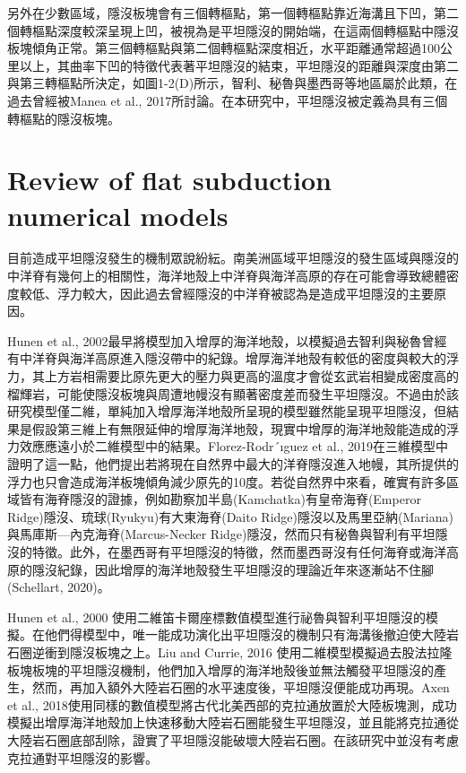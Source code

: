 另外在少數區域，隱沒板塊會有三個轉樞點，第一個轉樞點靠近海溝且下凹，第二個轉樞點深度較深呈現上凹，被視為是平坦隱沒的開始端，在這兩個轉樞點中隱沒板塊傾角正常。第三個轉樞點與第二個轉樞點深度相近，水平距離通常超過100公里以上，其曲率下凹的特徵代表著平坦隱沒的結束，平坦隱沒的距離與深度由第二與第三轉樞點所決定，如圖1-2(D)所示，智利、秘魯與墨西哥等地區屬於此類，在過去曾經被Manea et al., 2017所討論。在本研究中，平坦隱沒被定義為具有三個轉樞點的隱沒板塊。

\section{Review of flat subduction numerical models}

目前造成平坦隱沒發生的機制眾說紛紜。南美洲區域平坦隱沒的發生區域與隱沒的中洋脊有幾何上的相關性，海洋地殼上中洋脊與海洋高原的存在可能會導致總體密度較低、浮力較大，因此過去曾經隱沒的中洋脊被認為是造成平坦隱沒的主要原因。

Hunen et al., 2002最早將模型加入增厚的海洋地殼，以模擬過去智利與秘魯曾經有中洋脊與海洋高原進入隱沒帶中的紀錄。增厚海洋地殼有較低的密度與較大的浮力，其上方岩相需要比原先更大的壓力與更高的溫度才會從玄武岩相變成密度高的榴輝岩，可能使隱沒板塊與周遭地幔沒有顯著密度差而發生平坦隱沒。不過由於該研究模型僅二維，單純加入增厚海洋地殼所呈現的模型雖然能呈現平坦隱沒，但結果是假設第三維上有無限延伸的增厚海洋地殼，現實中增厚的海洋地殼能造成的浮力效應應遠小於二維模型中的結果。Florez-Rodr´ıguez et al., 2019在三維模型中證明了這一點，他們提出若將現在自然界中最大的洋脊隱沒進入地幔，其所提供的浮力也只會造成海洋板塊傾角減少原先的10度。若從自然界中來看，確實有許多區域皆有海脊隱沒的證據，例如勘察加半島(Kamchatka)有皇帝海脊(Emperor Ridge)隱沒、琉球(Ryukyu)有大東海脊(Daito Ridge)隱沒以及馬里亞納(Mariana)與馬庫斯—內克海脊(Marcus-Necker Ridge)隱沒，然而只有秘魯與智利有平坦隱沒的特徵。此外，在墨西哥有平坦隱沒的特徵，然而墨西哥沒有任何海脊或海洋高原的隱沒紀錄，因此增厚的海洋地殼發生平坦隱沒的理論近年來逐漸站不住腳(Schellart, 2020)。

Hunen et al., 2000 使用二維笛卡爾座標數值模型進行祕魯與智利平坦隱沒的模擬。在他們得模型中，唯一能成功演化出平坦隱沒的機制只有海溝後撤迫使大陸岩石圈逆衝到隱沒板塊之上。Liu and Currie, 2016 使用二維模型模擬過去股法拉隆板塊板塊的平坦隱沒機制，他們加入增厚的海洋地殼後並無法觸發平坦隱沒的產生，然而，再加入額外大陸岩石圈的水平速度後，平坦隱沒便能成功再現。Axen et al., 2018使用同樣的數值模型將古代北美西部的克拉通放置於大陸板塊測，成功模擬出增厚海洋地殼加上快速移動大陸岩石圈能發生平坦隱沒，並且能將克拉通從大陸岩石圈底部刮除，證實了平坦隱沒能破壞大陸岩石圈。在該研究中並沒有考慮克拉通對平坦隱沒的影響。

